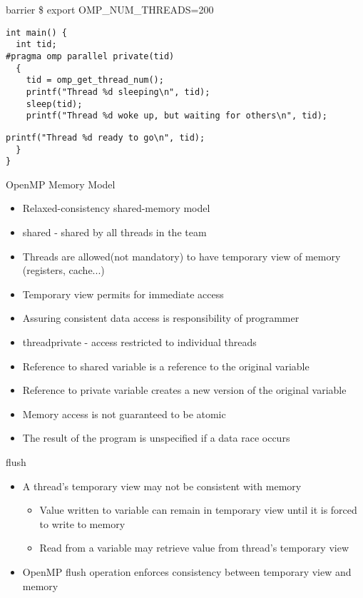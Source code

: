 \documentclass[10pt]{beamer}
\begin{document}
\begin{frame}[fragile]{barrier}
\$ export OMP\_NUM\_THREADS=200
\begin{Verbatim}[fontsize=\small, formatcom=\color{red}]
int main() {
  int tid;
#pragma omp parallel private(tid)
  {
    tid = omp_get_thread_num();
    printf("Thread %d sleeping\n", tid);
    sleep(tid);
    printf("Thread %d woke up, but waiting for others\n", tid);
\end{Verbatim}
\begin{Verbatim}[fontsize=\small, formatcom=\color{red}]
    printf("Thread %d ready to go\n", tid);
  }
}
\end{Verbatim}
\end{frame}

\begin{frame}{OpenMP Memory Model}
\begin{itemize}
\item Relaxed-consistency shared-memory model
\item shared - shared by all threads in the team
\item Threads are allowed(not mandatory) to have temporary view of memory
(registers, cache...)
\item Temporary view permits for immediate access
\item Assuring consistent data access is responsibility of programmer
\item threadprivate - access restricted to individual threads
\item Reference to shared variable is a reference to the original variable
\item Reference to private variable creates a new version of the original
variable
\item Memory access is not guaranteed to be atomic
\item The result of the program is unspecified if a data race occurs
\end{itemize}
\end{frame}

\begin{frame}{flush}
\begin{itemize}
\item A thread's temporary view may not be consistent with memory
\begin{itemize}
  \item Value written to variable can remain in temporary view until it is
        forced to write to memory
  \item Read from a variable may retrieve value from thread's temporary view
\end{itemize}
\item OpenMP flush operation enforces consistency between temporary view and
memory
\end{itemize}
\end{frame}
\end{document}
